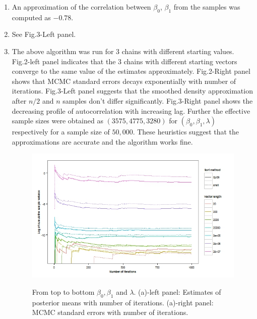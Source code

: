 \documentclass[12pt]{article}
\begin{document}
\begin{enumerate}[label=(\alph*)]
\item An approximation of the correlation between $\beta_0$, $\beta_1$ from the samples was computed as $-0.78$.

\item See Fig.3-Left panel.

\item The above algorithm was run for 3 chains with different starting values. Fig.2-left panel indicates that the $3$ chains with different starting vectors converge to the same value of the estimates approximately. Fig.2-Right panel shows that MCMC standard errors decays exponentially with number of iterations. Fig.3-Left panel suggests that the smoothed density approximation after $n/2$ and $n$ samples don't differ significantly. Fig.3-Right panel shows the decreasing profile of autocorrelation with increasing lag. Further the effective sample sizes were obtained as $(3575,4775,3280)$ for $(\beta_0,\beta_1,\lambda)$ respectively for a sample size of $50,000$. These heuristics suggest that the approximations are accurate and the algorithm works fine.
\begin{figure}[H]
\centering
  {\includegraphics[width=4.5in]{fig2.jpeg}}
  \caption{From top to bottom $\beta_0,\beta_1 $ and $\lambda$. (a)-left panel: Estimates of posterior means with number of iterations. (a)-right panel: MCMC standard errors with number of iterations.}

\end{figure}
\end{enumerate}
\end{document}
